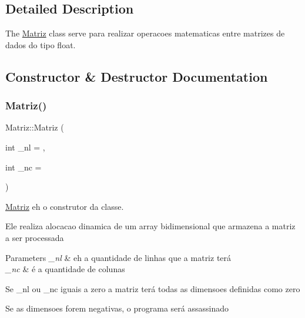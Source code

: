 \subsection{Detailed Description}
The \hyperlink{class_matriz}{Matriz} class serve para realizar operacoes matematicas entre matrizes de dados do tipo float. 

\subsection{Constructor \& Destructor Documentation}
\mbox{\label{class_matriz_a18222b86b1a474efd88b618aaa956ea3}} 
\subsubsection{\texorpdfstring{Matriz()}{Matriz()}\hspace{0.1cm}{\footnotesize\ttfamily [1/2]}}
{\footnotesize\ttfamily Matriz\+::\+Matriz (\begin{DoxyParamCaption}\item[{int}]{\+\_\+nl = {},  }\item[{int}]{\+\_\+nc = {} }\end{DoxyParamCaption})}



\hyperlink{class_matriz}{Matriz} eh o construtor da classe. 

Ele realiza alocacao dinamica de um array bidimensional que armazena a matriz a ser processada 
\begin{DoxyParams}{Parameters}
{\em \+\_\+nl} & eh a quantidade de linhas que a matriz terá \\
\hline
{\em \+\_\+nc} & é a quantidade de colunas 
\begin{DoxyEnumerate}
\item Se \+\_\+nl ou \+\_\+nc iguais a zero a matriz terá todas as dimensoes definidas como zero 
\item Se as dimensoes forem negativas, o programa será assassinado  
\end{DoxyEnumerate}\\
\hline
\end{DoxyParams}
\mbox{\label{class_matriz_a2092b7a289ecec369e1da407d5839f5a}} 
